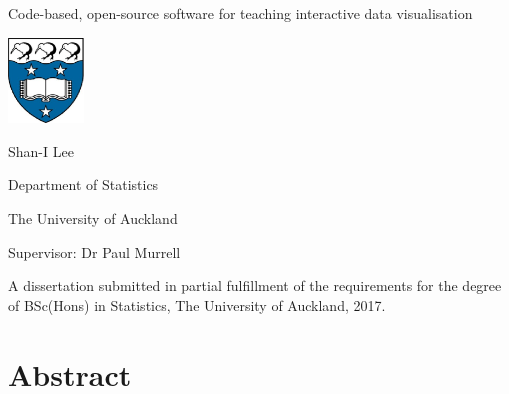 \documentclass[11pt]{book}
\begin{document}
\pagestyle{empty}



\begin{center}

\vspace{1cm}

{\Huge         Code-based, open-source software for teaching interactive data visualisation}

\vspace{35mm} 

\includegraphics[width=2cm]{logo}

 \vspace{45mm}

{\Large       Shan-I Lee}

	\vspace{1ex}

Department of Statistics

The University of Auckland

	\vspace{5ex}

Supervisor:            Dr Paul Murrell

	\vspace{30mm}

A dissertation  submitted in partial fulfillment of the requirements for the degree of BSc(Hons)  in Statistics, The University of Auckland, 2017.

\end{center}


  \newpage



\chapter*{Abstract}       
\setcounter{page}{1}
\pagestyle{headings}
\end{document}
